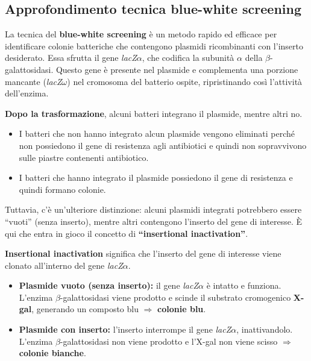 \subsection{Approfondimento tecnica blue-white screening}

La tecnica del \textbf{blue-white screening} è un metodo rapido ed efficace per identificare colonie batteriche che contengono plasmidi ricombinanti con l’inserto desiderato. Essa sfrutta il gene \textit{lacZ$\alpha$}, che codifica la subunità $\alpha$ della $\beta$-galattosidasi. Questo gene è presente nel plasmide e complementa una porzione mancante (\textit{lacZ$\omega$}) nel cromosoma del batterio ospite, ripristinando così l’attività dell’enzima.

\vspace{0.5em}

\textbf{Dopo la trasformazione}, alcuni batteri integrano il plasmide, mentre altri no.
\begin{itemize}\footnotesize
\item I batteri che non hanno integrato alcun plasmide vengono eliminati perché non possiedono il gene di resistenza agli antibiotici e quindi non sopravvivono sulle piastre contenenti antibiotico.
\item I batteri che hanno integrato il plasmide possiedono il gene di resistenza e quindi formano colonie.
\end{itemize}

\vspace{0.5em}

Tuttavia, c’è un’ulteriore distinzione: alcuni plasmidi integrati potrebbero essere “vuoti” (senza inserto), mentre altri contengono l’inserto del gene di interesse. È qui che entra in gioco il concetto di \textbf{“insertional inactivation”}.

\vspace{0.5em}

\textbf{Insertional inactivation} significa che l’inserto del gene di interesse viene clonato all’interno del gene \textit{lacZ$\alpha$}.
\begin{itemize}\footnotesize
\item \textbf{Plasmide vuoto (senza inserto):} il gene \textit{lacZ$\alpha$} è intatto e funziona. L’enzima $\beta$-galattosidasi viene prodotto e scinde il substrato cromogenico \textbf{X-gal}, generando un composto blu $\Rightarrow$ \textbf{colonie blu}.
\item \textbf{Plasmide con inserto:} l’inserto interrompe il gene \textit{lacZ$\alpha$}, inattivandolo. L’enzima $\beta$-galattosidasi non viene prodotto e l’X-gal non viene scisso $\Rightarrow$ \textbf{colonie bianche}.
\end{itemize}

